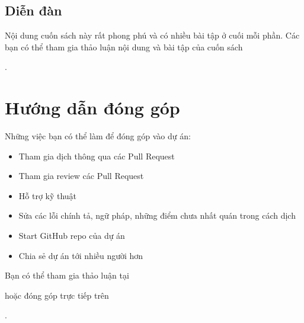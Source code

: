 \documentclass[letterpaper,11pt,english]{sphinxmanual}
\begin{document}
\subsection{Diễn đàn}
\label{\detokenize{intro_vn:dien-dan}}
Nội dung cuốn sách này rất phong phú và có nhiều bài tập ở cuối mỗi
phần. Các bạn có thể tham gia thảo luận nội dung và bài tập của cuốn
sách %
\begin{footnote}[6]\sphinxAtStartFootnote
{}
%
\end{footnote}.


\section{Hướng dẫn đóng góp}
\label{\detokenize{intro_vn:huong-dan-dong-gop}}
Những việc bạn có thể làm để đóng góp vào dự án:
\begin{itemize}
\item {} 
Tham gia dịch thông qua các Pull Request

\item {} 
Tham gia review các Pull Request

\item {} 
Hỗ trợ kỹ thuật

\item {} 
Sửa các lỗi chính tả, ngữ pháp, những điểm chưa nhất quán trong cách
dịch

\item {} 
Start GitHub repo của dự án

\item {} 
Chia sẻ dự án tới nhiều người hơn

\end{itemize}

Bạn có thể tham gia thảo luận tại %
\begin{footnote}[7]\sphinxAtStartFootnote
{}
%
\end{footnote}
hoặc đóng góp trực tiếp trên %
\begin{footnote}[8]\sphinxAtStartFootnote
{}
%
\end{footnote}.
\end{document}
